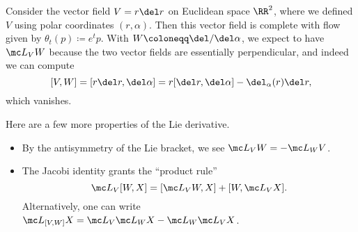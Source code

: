 \documentclass[../notes.tex]{subfiles}
\begin{document}
\begin{example}
	Consider the vector field $V=r\del r$ on Euclidean space $\RR^2$, where we defined $V$ using polar coordinates $(r,\alpha)$. Then this vector field is complete with flow given by $\theta_t(p)\coloneqq e^tp$. With $W\coloneqq\del/\del\alpha$, we expect to have $\mc L_VW$ because the two vector fields are essentially perpendicular, and indeed we can compute
	\[[V,W]=[r\del r,\del\alpha]=r[\del r,\del\alpha]-\del_\alpha(r)\del r,\]
	which vanishes.
\end{example}
\begin{remark}
	Here are a few more properties of the Lie derivative.
	\begin{itemize}
		\item By the antisymmetry of the Lie bracket, we see $\mc L_VW=-\mc L_WV$.
		\item The Jacobi identity grants the ``product rule''
		\[\mc L_V[W,X]=[\mc L_VW,X]+[W,\mc L_VX].\]
		Alternatively, one can write $\mc L_{[V,W]}X=\mc L_V\mc L_WX-\mc L_W\mc L_VX$.
	\end{itemize}
\end{remark}
\end{document}
